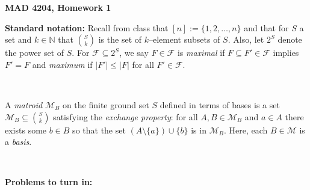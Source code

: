 \documentclass[11pt,letterpaper]{article}
\begin{document}

\flushleft

\begin{center}
\begin{large}\textbf{MAD 4204, Homework 1}\end{large}	
\end{center}

\pagestyle{empty}


\flushleft

\textbf{Standard notation:} Recall from class that $[n] := \{1,2,\dots,n\}$ and that for $S$ a set and $k \in \mathbb{N}$ that $\binom{S}{k}$ is the set of $k$--element subsets of $S$.
Also, let $2^S$ denote the power set of $S$.
For $\mathcal{F} \subseteq 2^S$, we say $F \in \mathcal{F}$ is \emph{maximal} if $F \subseteq F' \in \mathcal{F}$ implies $F' = F$ and \emph{maximum} if $|F'| \leq |F|$ for all $F' \in \mathcal{F}$.

\ 

A \emph{matroid} $\mathcal{M}_B$ on the finite ground set $S$ defined in terms of bases is a set $\mathcal{M}_B \subseteq \binom{S}{k}$ satisfying the \emph{exchange property}: for all $A, B \in \mathcal{M}_B$ and $a \in A$ there exists some $b \in B$ so that the set $(A \setminus \{a\}) \cup \{b\}$ is in $\mathcal{M}_B$.
Here, each $B \in \mathcal{M}$ is a \emph{basis}.

\ 



\textbf{Problems to turn in:}
\end{document}
